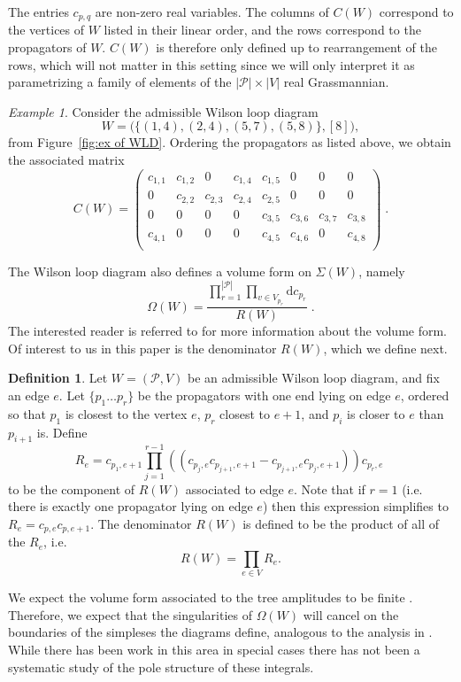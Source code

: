 \documentclass[11pt]{article}
\newcommand{\cP}{\mathcal{P}}
\theoremstyle{remark}
\newtheorem{eg}[thm]{Example}
\theoremstyle{definition}
\newtheorem{dfn}[thm]{Definition}
\begin{document}
The entries $c_{p,q}$ are non-zero real variables. The columns of $C(W)$ correspond to the vertices of $W$ listed in their linear order, and the rows correspond to the propagators of $W$. $C(W)$ is therefore only defined up to rearrangement of the rows, which will not matter in this setting since we will only interpret it as parametrizing a family of elements of the $|\cP| \times |V|$ real Grassmannian.

\begin{eg}
Consider the admissible Wilson loop diagram 
\[W = \big(\{(1,4), (2,4), (5,7), (5,8)\},[8]\big),\]
from Figure~\ref{fig:ex of WLD}. Ordering the propagators as listed above, we obtain the associated matrix
\[ C(W) = \left(
\begin{array}{cccccccc}
c_{1,1} & c_{1,2} & 0 & c_{1,4} & c_{1,5} & 0 & 0 & 0 \\
0 & c_{2,2} & c_{2,3} & c_{2,4} & c_{2,5} & 0 & 0 & 0 \\
0 & 0 & 0 & 0 & c_{3,5} & c_{3,6} & c_{3,7} & c_{3,8} \\
c_{4,1} & 0 & 0 & 0 & c_{4,5} & c_{4,6} & 0 & c_{4,8}  \\
\end{array}
\right) \;.\]
\end{eg}




The Wilson loop diagram also defines a volume form on $\Sigma(W)$, namely 
\[ \Omega(W) = \frac{\prod_{r=1}^{|\cP|} \prod_{v \in V_{p_r}} \textrm{d}c_{p_r}}{R(W)} \;. \]
The interested reader is referred to \cite{Adamo:2012xe,HeslopStewart,LipsteinMason} for more information about the volume form. Of interest to us in this paper is the denominator $R(W)$, which we define next.

\begin{dfn}\label{def R(W)}
Let $W = (\cP,V)$ be an admissible Wilson loop diagram, and fix an edge $e$. Let $\{p_1 \ldots p_r\}$ be the propagators with one end lying on edge $e$, ordered so that $p_1$ is closest to the vertex $e$, $p_r$ closest to $e+1$, and $p_i$ is closer to $e$ than $p_{i+1}$ is. Define 
\[ R_e =  c_{p_1,e+1} \prod_{j= 1}^{r-1} \left((c_{p_j,e} c_{p_{j+1},e+1} - c_{p_{j+1},e} c_{p_{j},e+1} ) \right) c_{p_r,e}\;\]
to be the component of $R(W)$ associated to edge $e$. Note that if $r = 1$ (i.e. there is exactly one propagator lying on edge $e$) then this expression simplifies to $R_e = c_{p,e} c_{p,e+1}$. The denominator $R(W)$ is defined to be the product of all of the $R_e$, i.e. 
\[R(W) = \prod_{e \in V} R_e.\]
\end{dfn}
We expect the volume form associated to the tree amplitudes to be finite \cite{Adamo:2011pv,Adamo:2012xe,Arkani-Hamed:2013jha}. Therefore, we expect that the singularities of $\Omega(W)$ will cancel on the boundaries of the simpleses the diagrams define, analogous to the analysis in \cite{Arkani-Hamed:2013jha}. While there has been work in this area in special cases \cite{Amplituhedronsquared,HeslopStewart,casestudy} there has not been a systematic study of the pole structure of these integrals.
\end{document}
